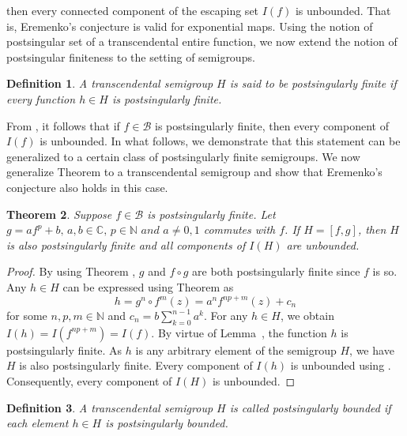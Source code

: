 \documentclass[a4paper,12pt]{amsart}
\numberwithin{equation}{section}
\newtheorem{theorem}{Theorem}[section]
\newtheorem{definition}[theorem]{Definition}
\begin{document}
then every connected component of the escaping set $I(f)$ is unbounded. That is, Eremenko’s conjecture \cite{eremenko1989iteration} is valid for exponential maps. Using the notion of postsingular set of a transcendental entire function, 
	we now extend the notion of postsingular finiteness to the setting of semigroups.  
\begin{definition} A transcendental semigroup $H$ is said to be postsingularly finite if every function $h\in H$ is postsingularly finite.  
\end{definition}
From \cite[ Theorem 1.1]{rempequestion}, it follows that if $f\in \mathcal{B}$ is postsingularly finite, then every component of $I(f)$ is unbounded. In what follows, we demonstrate that this statement can be generalized to a certain class of postsingularly finite semigroups.
We now generalize Theorem  to a transcendental semigroup and show that Eremenko's conjecture also holds in this case.
\begin{theorem}
	Suppose $f \in \mathcal{B}$ is postsingularly finite. Let $g = af^p + b,\, a,b \in \mathbb{C},\, p \in \mathbb{N} \, \, and \,\, a \neq 0,1$ commutes with $f$. If $H = [f,g]$, then $H$ is also postsingularly finite and all components of $I(H)$ are unbounded. 
\end{theorem}
\begin{proof}
	By using Theorem , $g$ and $f\circ g$ are both postsingularly finite since $f$ is so. Any $h\in H$ can be expressed using Theorem  as \[h = g^n \circ f^m(z) = a^n f^{np+m}(z) + c_n\] for some $n, p, m \in \mathbb{N}$ and $c_n= b \sum_{k=0}^{n-1} a^k$. For any $h\in H$, we obtain $I(h) = I(f^{np+m}) = I(f)$. By virtue of Lemma~, the function $h$ is postsingularly finite. As $h$ is any arbitrary element of the semigroup $H$, we have $H$ is also postsingularly finite. Every component of $I(h)$ is unbounded using \cite[Theorem 1.1]{rempequestion}. Consequently, every component of $I(H)$ is unbounded. 
\end{proof}
\begin{definition}
	A transcendental semigroup $H$ is called \emph{postsingularly
		bounded} if each element $h \in H$ is postsingularly bounded.
\end{definition}
\end{document}
